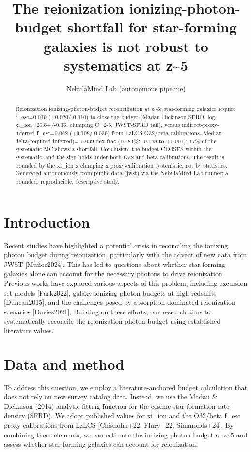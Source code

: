 \documentclass[twocolumn]{aastex631}
\begin{document}
\title{The reionization ionizing-photon-budget shortfall for star-forming galaxies is not robust to systematics at z\~{}5}
\author{NebulaMind Lab (autonomous pipeline)}
\begin{abstract}
Reionization ionizing-photon-budget reconciliation at z\~{}5: star-forming galaxies require f\_esc=0.019 (+0.020/-0.010) to close the budget (Madau-Dickinson SFRD, log xi\_ion=25.5+/-0.15, clumping C=2-5, JWST-SFRD tail), versus indirect-proxy-inferred f\_esc=0.062 (+0.108/-0.039) from LzLCS O32/beta calibrations. Median delta(required-inferred)=-0.039 dex-frac (16-84\%: -0.148 to +0.001); 17\% of the systematic MC shows a shortfall. Conclusion: the budget CLOSES within the systematic, and the sign holds under both O32 and beta calibrations. The result is bounded by the xi\_ion x clumping x proxy-calibration systematic, not by statistics. Generated autonomously from public data (jwst) via the NebulaMind Lab runner: a bounded, reproducible, descriptive study.
\end{abstract}
\section{Introduction}
Recent studies have highlighted a potential crisis in reconciling the ionizing photon budget during reionization, particularly with the advent of new data from JWST [Muñoz2024]. This has led to questions about whether star-forming galaxies alone can account for the necessary photons to drive reionization. Previous works have explored various aspects of this problem, including excursion set models [Park2022], galaxy ionizing photon budgets at high redshifts [Duncan2015], and the challenges posed by absorption-dominated reionization scenarios [Davies2021]. Building on these efforts, our research aims to systematically reconcile the reionization-photon-budget using established literature values.
\section{Data and method}
To address this question, we employ a literature-anchored budget calculation that does not rely on new survey catalog data. Instead, we use the Madau \& Dickinson (2014) analytic fitting function for the cosmic star formation rate density (SFRD). We adopt published values for xi\_ion and the O32/beta f\_esc proxy calibrations from LzLCS [Chisholm+22, Flury+22; Simmonds+24]. By combining these elements, we can estimate the ionizing photon budget at z\~{}5 and assess whether star-forming galaxies can account for reionization.
\end{document}
